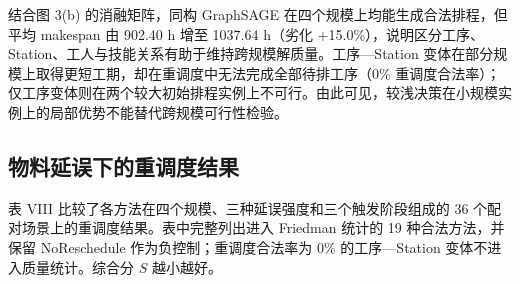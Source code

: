 \documentclass[journal,10pt]{IEEEtran}
\begin{document}
结合图 3(b) 的消融矩阵，同构 GraphSAGE 在四个规模上均能生成合法排程，但平均 makespan 由 902.40 h 增至 1037.64 h（劣化 +15.0\%），说明区分工序、Station、工人与技能关系有助于维持跨规模解质量。工序---Station 变体在部分规模上取得更短工期，却在重调度中无法完成全部待排工序（0\% 重调度合法率）；仅工序变体则在两个较大初始排程实例上不可行。由此可见，较浅决策在小规模实例上的局部优势不能替代跨规模可行性检验。

\subsection{物料延误下的重调度结果}\label{sec:resched_results}

表 VIII 比较了各方法在四个规模、三种延误强度和三个触发阶段组成的 36 个配对场景上的重调度结果。表中完整列出进入 Friedman 统计的 19 种合法方法，并保留 No\allowbreak{}Reschedule 作为负控制；重调度合法率为 0\% 的工序---Station 变体不进入质量统计。综合分 $S$ 越小越好。
\end{document}
